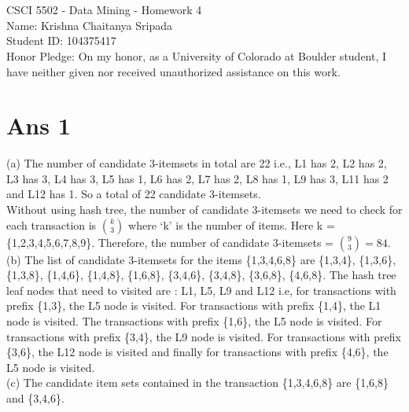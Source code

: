 \documentclass[10pt]{article}
\begin{document}
\section*{}
\begin{flushleft}
CSCI 5502 - Data Mining - Homework 4\\
Name: Krishna Chaitanya Sripada\\
Student ID: 104375417\\
Honor Pledge: On my honor, as a University of Colorado at Boulder student, I have neither given nor received unauthorized assistance on this work.
\end{flushleft}
\section*{Ans 1}
\begin{flushleft}
(a) The number of candidate 3-itemsets in total are 22 i.e., L1 has 2, L2 has 2, L3 has 3, L4 has 3, L5 has 1, L6 has 2, L7 has 2, L8 has 1, L9 has 3, L11 has 2 and L12 has 1. So a total of 22 candidate 3-itemsets.\\
\vspace{0.5em}
Without using hash tree, the number of candidate 3-itemsets we need to check for each transaction is ${k \choose 3}$ where `k' is the number of items. Here k = \{1,2,3,4,5,6,7,8,9\}. Therefore, the number of candidate 3-itemsets = ${9 \choose 3} = 84$.\\
\vspace{1em}
(b) The list of candidate 3-itemsets for the items \{1,3,4,6,8\} are \{1,3,4\}, \{1,3,6\}, \{1,3,8\}, \{1,4,6\}, \{1,4,8\}, \{1,6,8\}, \{3,4,6\}, \{3,4,8\}, \{3,6,8\}, \{4,6,8\}. The hash tree leaf nodes that need to visited are : L1, L5, L9 and L12 i.e, for transactions with prefix \{1,3\}, the L5 node is visited. For transactions with prefix \{1,4\}, the L1 node is visited. The transactions with prefix \{1,6\}, the L5 node is visited. For transactions with prefix \{3,4\}, the L9 node is visited. For transactions with prefix \{3,6\}, the L12 node is visited and finally for transactions with prefix \{4,6\}, the L5 node is visited.\\
\vspace{1em}
(c) The candidate item sets contained in the transaction \{1,3,4,6,8\} are \{1,6,8\} and \{3,4,6\}.
\end{flushleft}
\end{document}
